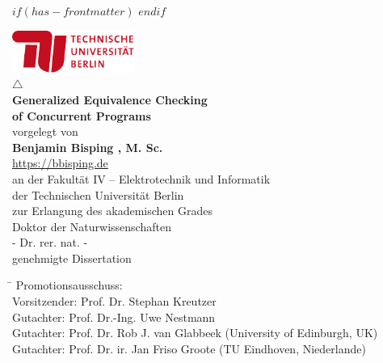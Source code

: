 $if(has-frontmatter)$
\frontmatter
$endif$
%
\makeatletter
  \let\ps@plain\ps@empty
\makeatother
\setlength{\headheight}{15pt}
\addtolength{\headwidth}{\marginparwidth}
\fancyhf{}
\fancyhead[LO]{\nouppercase{\rightmark}}
\fancyhead[RO]{\thepage}
\fancyhead[LE]{\thepage}
\fancyhead[RE]{\nouppercase{\leftmark}}
\renewcommand{\headrulewidth}{0pt}
\pagestyle{fancy}
\begin{titlepage}
    \begin{center}
        \includegraphics[width=0.3\textwidth]{img/tu-berlin-logo-long-red.pdf}\\[5pt]
        \vspace{3cm}
        {\Large \(\triangle\)}\\[5pt]
        {\huge\bfseries Generalized Equivalence Checking \\ of Concurrent Programs\\}
        \vspace{1.5cm}
        \vfill
        vorgelegt von\\[1em]
        {\Large\bfseries Benjamin Bisping , M. Sc.}
        \\[5pt]
        \url{https://bbisping.de}\\[14pt]
        \vfill
        an der Fakultät IV – Elektrotechnik und Informatik\\
        der Technischen Universität Berlin\\
        zur Erlangung des akademischen Grades\\[1em]
        Doktor der Naturwissenschaften\\
        - Dr. rer. nat. -\\[1em]

        genehmigte Dissertation
        \vspace{1cm}
    \end{center}

    \noindent
    \begin{tabbing}
      \hspace*{7em}\=\hspace*{12em}\kill
      Promotionsausschuss:\\[1em]
      Vorsitzender: \> Prof. Dr. Stephan Kreutzer\\
      Gutachter: \> Prof. Dr.-Ing. Uwe Nestmann\\
      Gutachter: \> Prof. Dr. Rob J. van Glabbeek (University of Edinburgh, UK)\\
      Gutachter: \> Prof. Dr. ir. Jan Friso Groote (TU Eindhoven, Niederlande)\\
    \end{tabbing}


\end{titlepage}
